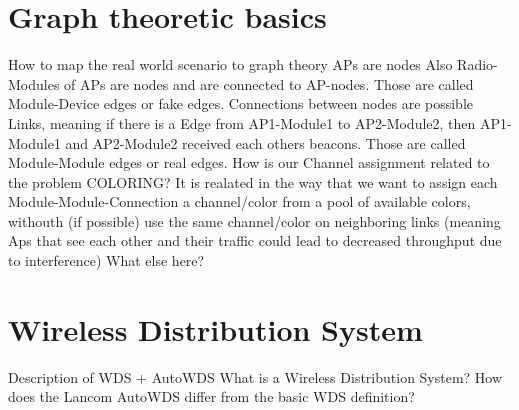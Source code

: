\section{Graph theoretic basics}
  How to map the real world scenario to graph theory\newline
    APs are nodes \newline
    Also Radio-Modules of APs are nodes and are connected to AP-nodes. Those are called Module-Device edges or fake edges.\newline
    Connections between nodes are possible Links, meaning if there is a Edge from AP1-Module1 to AP2-Module2, then AP1-Module1 and AP2-Module2 received each others beacons. Those are called Module-Module edges or real edges. \newline
  How is our Channel assignment related to the problem COLORING?\newline
    It is realated in the way that we want to assign each Module-Module-Connection a channel/color from a pool of available colors, withouth (if possible) use the same channel/color on neighboring links (meaning Aps that see each other and their traffic could lead to decreased throughput due to interference)
  What else here?
\section{Wireless Distribution System}
  Description of WDS + AutoWDS \newline
    What is a Wireless Distribution System? \newline
    How does the Lancom AutoWDS differ from the basic WDS definition? \newline
